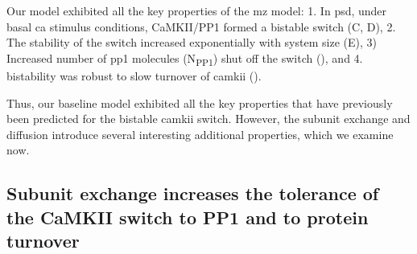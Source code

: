 \documentclass[9pt,lineno,doublespacing]{elife}
\newcommand\SUB[2]{#1\textsubscript{#2}}
\begin{document}
Our model exhibited all the key properties of the \gls{mz} model: 1. In
\gls{psd}, under basal \gls{ca}  stimulus conditions, CaMKII/PP1 formed a
bistable switch (C, D), 2. The stability of the switch
increased exponentially with system size (E), 3)
Increased number of \gls{pp1} molecules (\SUB{N}{PP1}) shut off the switch
(), and 4. bistability was robust to slow turnover
of \gls{camkii} ().

Thus, our baseline model exhibited all the key properties that have
previously been predicted for the bistable \gls{camkii} switch. However, the
subunit exchange and diffusion introduce several interesting additional
properties, which we examine now.

\subsection{Subunit exchange increases the tolerance of the CaMKII switch to PP1 
and to protein turnover}\label{subsec:result_tolerance}
\end{document}
